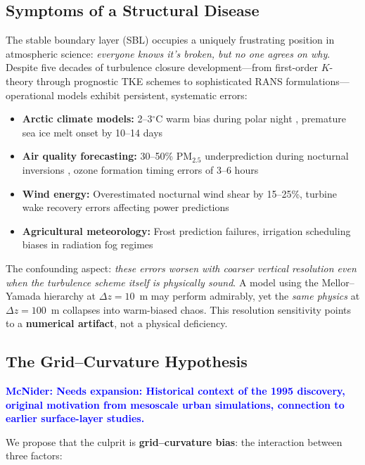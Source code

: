 \documentclass[twocolumn,11pt]{article}
\newcommand{\MCNIDER}[1]{\textcolor{blue}{\textbf{McNider: #1}}}
\begin{document}
\subsection{Symptoms of a Structural Disease}

The stable boundary layer (SBL) occupies a uniquely frustrating position in atmospheric science: \textit{everyone knows it's broken, but no one agrees on why}. Despite five decades of turbulence closure development—from first-order $K$-theory through prognostic TKE schemes to sophisticated RANS formulations—operational models exhibit persistent, systematic errors:

\begin{itemize}
\item \textbf{Arctic climate models:} 2--3$^\circ$C warm bias during polar night \citep{svensson2009,sterk2013}, premature sea ice melt onset by 10--14 days \citep{stroeve2012}
\item \textbf{Air quality forecasting:} 30--50\% PM$_{2.5}$ underprediction during nocturnal inversions \citep{biazar2024}, ozone formation timing errors of 3--6 hours
\item \textbf{Wind energy:} Overestimated nocturnal wind shear by 15--25\%, turbine wake recovery errors affecting power predictions
\item \textbf{Agricultural meteorology:} Frost prediction failures, irrigation scheduling biases in radiation fog regimes
\end{itemize}

\noindent The confounding aspect: \textit{these errors worsen with coarser vertical resolution even when the turbulence scheme itself is physically sound}. A model using the Mellor--Yamada hierarchy at $\Delta z = 10$~m may perform admirably, yet the \textit{same physics} at $\Delta z = 100$~m collapses into warm-biased chaos. This resolution sensitivity points to a \textbf{numerical artifact}, not a physical deficiency.

\subsection{The Grid--Curvature Hypothesis}

\MCNIDER{Needs expansion: Historical context of the 1995 discovery, original motivation from mesoscale urban simulations, connection to earlier surface-layer studies.}

We propose that the culprit is \textbf{grid--curvature bias}: the interaction between three factors:
\end{document}
